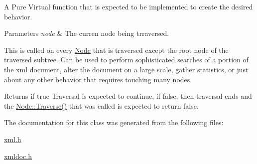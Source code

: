 A Pure Virtual function that is expected to be implemented to create the desired behavior. 


\begin{DoxyParams}{Parameters}
{\em node} & The curren node being trraversed.\\
\hline
\end{DoxyParams}
This is called on every \hyperlink{classMezzanine_1_1xml_1_1Node}{Node} that is traversed except the root node of the traversed subtree. Can be used to perform sophisticated searches of a portion of the xml document, alter the document on a large scale, gather statistics, or just about any other behavior that requires touching many nodes. \begin{DoxyReturn}{Returns}
if true Traversal is expected to continue, if false, then traversal ends and the \hyperlink{classMezzanine_1_1xml_1_1Node_a3115c4b78afaa9b27a54c1d4200dbcc7}{Node::Traverse()} that was called is expected to return false. 
\end{DoxyReturn}


The documentation for this class was generated from the following files:\begin{DoxyCompactItemize}
\item 
\hyperlink{xml_8h}{xml.h}\item 
\hyperlink{xmldoc_8h}{xmldoc.h}\end{DoxyCompactItemize}
